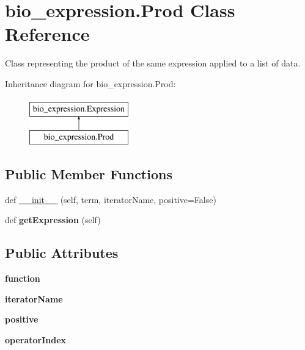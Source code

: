 \hypertarget{classbio__expression_1_1_prod}{}\section{bio\+\_\+expression.\+Prod Class Reference}
\label{classbio__expression_1_1_prod}


Class representing the product of the same expression applied to a list of data.  


Inheritance diagram for bio\+\_\+expression.\+Prod\+:\begin{figure}[H]
\begin{center}
\leavevmode
\includegraphics[height=2.000000cm]{classbio__expression_1_1_prod}
\end{center}
\end{figure}
\subsection*{Public Member Functions}
\begin{DoxyCompactItemize}
\item 
def \hyperlink{classbio__expression_1_1_prod_aefc065fd66e564921e002287720ca15f}{\+\_\+\+\_\+init\+\_\+\+\_\+} (self, term, iterator\+Name, positive=False)
\item 
def {\bfseries get\+Expression} (self)\hypertarget{classbio__expression_1_1_prod_a40185838fd0be61cff5c5dc7e5142e88}{}\label{classbio__expression_1_1_prod_a40185838fd0be61cff5c5dc7e5142e88}

\end{DoxyCompactItemize}
\subsection*{Public Attributes}
\begin{DoxyCompactItemize}
\item 
{\bfseries function}\hypertarget{classbio__expression_1_1_prod_ad701a84ab99b64715360bd7cd3f23b72}{}\label{classbio__expression_1_1_prod_ad701a84ab99b64715360bd7cd3f23b72}

\item 
{\bfseries iterator\+Name}\hypertarget{classbio__expression_1_1_prod_a44847763ff32dfe95d002b49e733bfc2}{}\label{classbio__expression_1_1_prod_a44847763ff32dfe95d002b49e733bfc2}

\item 
{\bfseries positive}\hypertarget{classbio__expression_1_1_prod_a2b418ff03d043dd99bca62aef5b42962}{}\label{classbio__expression_1_1_prod_a2b418ff03d043dd99bca62aef5b42962}

\item 
{\bfseries operator\+Index}\hypertarget{classbio__expression_1_1_prod_abc58ca6ede4902b55b96afb0ecaf22c7}{}\label{classbio__expression_1_1_prod_abc58ca6ede4902b55b96afb0ecaf22c7}

\end{DoxyCompactItemize}


